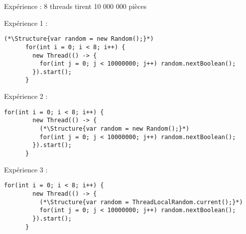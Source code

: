 
\begingroup

\begin{frame}[fragile]{Expérience : 8 threads tirent 10 000 000 pièces}

  \vspace{-3mm}
  \begin{block}{Expérience 1 : }\vspace{-3mm}
    \begin{lstlisting}[gobble=4]
      (*\Structure{var random = new Random();}*)
      for(int i = 0; i < 8; i++) {
        new Thread(() -> {
          for(int j = 0; j < 10000000; j++) random.nextBoolean();
        }).start();
      }
    \end{lstlisting}
  \end{block}

  \vspace{-3mm}
  \begin{block}{Expérience 2 : }\vspace{-3mm}
    \begin{lstlisting}[gobble=4]
      for(int i = 0; i < 8; i++) {
        new Thread(() -> {
          (*\Structure{var random = new Random();}*)
          for(int j = 0; j < 10000000; j++) random.nextBoolean();
        }).start();
      }
    \end{lstlisting}
  \end{block}

  \vspace{-3mm}
  \begin{block}{Expérience 3 : }\vspace{-3mm}
    \begin{lstlisting}[gobble=4]
      for(int i = 0; i < 8; i++) {
        new Thread(() -> {
          (*\Structure{var random = ThreadLocalRandom.current();}*)
          for(int j = 0; j < 10000000; j++) random.nextBoolean();
        }).start();
      }
    \end{lstlisting}
  \end{block}


\end{frame}

\endgroup
\endinput
